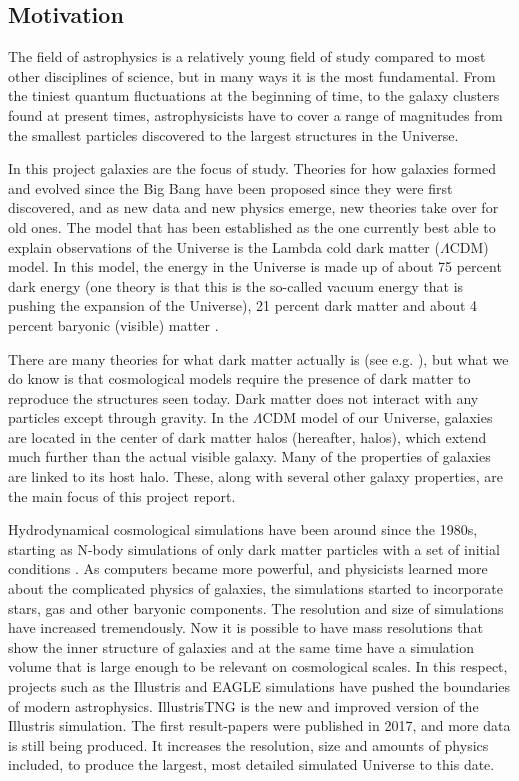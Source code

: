 
\noindent
\subsection{Motivation}
The field of astrophysics is a relatively young field of study compared to most other disciplines of science, but in many ways it is the most fundamental. From the tiniest quantum fluctuations at the beginning of time, to the galaxy clusters found at present times, astrophysicists have to cover a range of magnitudes from the smallest particles discovered to the largest structures in the Universe. 

In this project galaxies are the focus of study. Theories for how galaxies formed and evolved since the Big Bang have been proposed since they were first discovered, and as new data and new physics emerge, new theories take over for old ones. The model that has been established as the one currently best able to explain observations of the Universe is the Lambda cold dark matter ($\Lambda$CDM) model. In this model, the energy in the Universe is made up of about 75 percent dark energy (one theory is that this is the so-called vacuum energy that is pushing the expansion of the Universe), 21 percent dark matter and about 4 percent baryonic (visible) matter \parencite{Planck2016}. 

There are many theories for what dark matter actually is (see e.g. \textcite{Boveia2018}), but what we do know is that cosmological models require the presence of dark matter to reproduce the structures seen today. Dark matter does not interact with any particles except through gravity. In the $\Lambda$CDM model of our Universe, galaxies are located in the center of dark matter halos (hereafter, halos), which extend much further than the actual visible galaxy. Many of the properties of galaxies are linked to its host halo. These, along with several other galaxy properties, are the main focus of this project report.

Hydrodynamical cosmological simulations have been around since the 1980s, starting as N-body simulations of only dark matter particles with a set of initial conditions \parencite{Frenk1983}. As computers became more powerful, and physicists learned more about the complicated physics of galaxies, the simulations started to incorporate stars, gas and other baryonic components. The resolution and size of simulations have increased tremendously. Now it is possible to have mass resolutions that show the inner structure of galaxies and at the same time have a simulation volume that is large enough to be relevant on cosmological scales. In this respect, projects such as the Illustris and EAGLE simulations have pushed the boundaries of modern astrophysics. IllustrisTNG is the new and improved version of the Illustris simulation. The first result-papers were published in 2017, and more data is still being produced. It increases the resolution, size and amounts of physics included, to produce the largest, most detailed simulated Universe to this date. 

